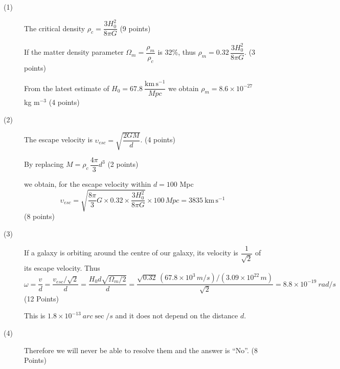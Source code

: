 \begin{description}
\item[(1)] The critical density $\rho_c = \dfrac{3H_0^2}{8\pi G}$
\hfill(9 points)

If the matter density parameter
$\Omega_m = \dfrac{\rho_m}{\rho_c}$ is 32\%, thus
$\rho_m = 0.32\,\dfrac{3H_0^2}{8\pi G}$.
\hfill(3 points)

From the latest estimate of
$H_0 = 67.8\ \dfrac{\mathrm{km\,s^{-1}}}{Mpc}$ we obtain
$\rho_m = 8.6\times10^{-27}$ kg m$^{-3}$
\hfill(4 points)

\item[(2)] The escape velocity is
$\upsilon_{esc} = \sqrt{\dfrac{2GM}{d}}$.
\hfill(4 points)

By replacing $M = \rho_c\,\dfrac{4\pi}{3}d^3$
\hfill(2 points)

we obtain, for the escape velocity within $d = 100$ Mpc
\[
\upsilon_{esc}
= \sqrt{\frac{8\pi}{3}G\times0.32\times\frac{3H_0^2}{8\pi G}}
  \times 100\,Mpc
= 3835\ \mathrm{km\,s^{-1}}
\]
\hfill(8 points)

\item[(3)] If a galaxy is orbiting around the centre of our galaxy, its
velocity is $\dfrac{1}{\sqrt{2}}$ of its escape velocity. Thus
\[
\omega = \frac{v}{d} = \frac{v_{esc}/\sqrt{2}}{d}
= \frac{H_0 d\sqrt{\Omega_m/2}}{d}
= \frac{\sqrt{0.32}\,(67.8\times10^{3}\,m/s)/(3.09\times10^{22}\,m)}
  {\sqrt{2}}
= 8.8\times10^{-19}\ rad/s
\]
\hfill(12 Points)

This is $1.8\times10^{-13}\ arc\sec/s$ and it does not depend on the
distance $d$.

\item[(4)] Therefore we will never be able to resolve them and the answer is
``No''.
\hfill(8 Points)
\end{description}

